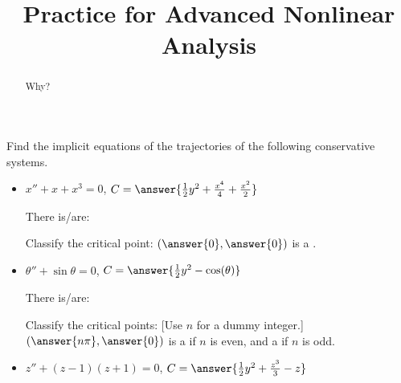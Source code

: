 \documentclass{ximera}
\title{Practice for Advanced Nonlinear Analysis}
\begin{document}
\begin{abstract}
Why?
\end{abstract}
\maketitle


\begin{exercise}
    Find the implicit equations of the trajectories of the following conservative systems.  
    \begin{itemize}
        \item $x''+ x+x^3 = 0$, $C = \answer{\frac{1}{2}y^2 + \frac{x^4}{4} + \frac{x^2}{2}}$
            \begin{problem}
                There is/are:
                \begin{multipleChoice}
                \end{multipleChoice}
                \begin{problem}
                    Classify the critical point: $\left(\answer{0}, \answer{0}\right)$ is a .
                \end{problem}
            \end{problem}
        \item $\theta''+\sin \theta = 0$, $C = \answer{\frac{1}{2}y^2 - \cos(\theta)}$
            \begin{problem}
                There is/are:
                \begin{multipleChoice}
                \end{multipleChoice}
                \begin{problem}
                    Classify the critical points: [Use $n$ for a dummy integer.] $\left(\answer{n\pi}, \answer{0}\right)$ is a  if $n$ is even, and a  if $n$ is odd. 
                \end{problem}
            \end{problem}
        \item $z''+ (z-1)(z+1) = 0$, $C = \answer{\frac{1}{2}y^2 + \frac{z^3}{3} - z}$

\end{itemize}
\end{exercise}
\end{document}
